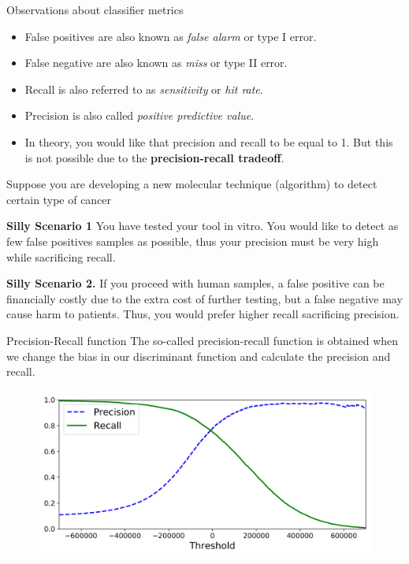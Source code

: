\documentclass{beamer}
\begin{document}
\begin{frame}{Observations about classifier metrics}
	\begin{itemize}
		\item False positives are  also known as {\it false alarm} or type I error.
		\item False negative are also known as {\it miss} or type II error.
		\item Recall is also referred to as {\it sensitivity} or {\it hit rate}.
		\item Precision is also called {\it positive predictive value}.
		\item In theory, you would like that precision and recall to be equal to 1. But this is not possible due to the {\bf precision-recall tradeoff}. 
	\end{itemize}


Suppose you are developing a new molecular technique (algorithm) to detect certain type of cancer  

{\bf Silly Scenario 1 }
You have tested your tool in vitro. You would like to detect as few false positives samples as possible, thus your precision must be very high while sacrificing recall.

{\bf Silly Scenario 2.}
If you proceed with human samples, 
a false positive can be financially costly due to the extra cost of further testing, but a false negative may cause harm to patients. Thus,  you would prefer higher recall sacrificing precision.
\end{frame}

\begin{frame}{Precision-Recall function}
	The so-called precision-recall function is obtained when we change the bias in our discriminant function and calculate the precision and recall. 
\begin{figure}
	\centering
	\includegraphics[scale=0.45]{../../Figures/precision_recall_vs_threshold_plot.png}
\end{figure}	
	
\end{frame}
\end{document}

